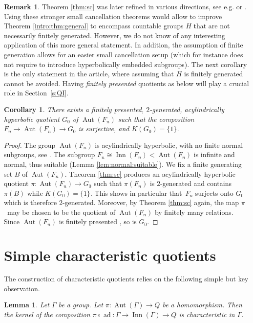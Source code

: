 \documentclass[11pt]{article}
\newtheorem{corollary}[theorem]{Corollary}
\newtheorem{lemma}[theorem]{Lemma}
\theoremstyle{definition}
\newtheorem{remark}[theorem]{Remark}
\newcommand{\Aut}{\operatorname{Aut}}
\newcommand{\Inn}{\operatorname{Inn}}
\newcommand{\ad}{\operatorname{ad}}
\begin{document}
\begin{remark}
Theorem \ref{thm:sc} was later refined in various directions, see e.g. \cite[Prop.\,3.3]{hull:improved} or \cite[Th.\,3.27]{CIOS}. Using these stronger small cancellation theorems would allow to improve Theorem \ref{intro:thm:general} to encompass countable groups $H$ that are not necessarily finitely generated. However, we do not know of any interesting application of this more general statement.
In addition, the assumption of finite generation allows for an easier small cancellation setup (which for instance does not require to introduce hyperbolically embedded subgroups).
The next corollary is the only statement in the article, where assuming that $H$ is finitely generated cannot be avoided.
Having \emph{finitely presented} quotients as below will play a crucial role in Section~\ref{s:QI}.
\end{remark}

\begin{corollary}
\label{lem:fp}
There exists a finitely presented, $2$-generated, acylindrically hyperbolic quotient $G_0$ of $\Aut(F_n)$ such that the composition $F_n \to \Aut(F_n) \to G_0$ is surjective, and $K(G_0) = \{ 1 \}$.
\end{corollary}

\begin{proof}
The group $\Aut(F_n)$ is acylindrically hyperbolic, with no finite normal subgroups, see \cite{auto:infend}.
The subgroup $F_n \cong \Inn(F_n) < \Aut(F_n)$ is infinite and normal, thus suitable (Lemma \ref{lem:normal:suitable}). We fix a finite generating set $B$ of $\Aut(F_n)$. Theorem \ref{thm:sc} produces an acylindrically hyperbolic quotient $\pi : \Aut(F_n) \to G_0$ such that $\pi(F_n)$ is $2$-generated and contains $\pi(B)$ while $K(G_0) = \{1\}$.
This shows in particular that~$F_n$ surjects onto $G_0$ which is therefore $2$-generated.
Moreover, by Theorem \ref{thm:sc} again, the map $\pi$~may be chosen to be the quotient of $\Aut(F_n)$ by finitely many relations.
Since $\Aut(F_n)$ is finitely presented \cite{nielsen}, so is $G_0$.
\end{proof}

\section{Simple characteristic quotients}

The construction of characteristic quotients relies on the following simple but key observation.

\begin{lemma}
\label{lem:char}
Let $\Gamma$ be a group.
Let $\pi : \Aut(\Gamma) \to Q$ be a homomorphism.
Then the kernel of the composition $\pi \circ \ad : \Gamma \to \Inn(\Gamma) \to Q$ is characteristic in $\Gamma$.
\end{lemma}
\end{document}
